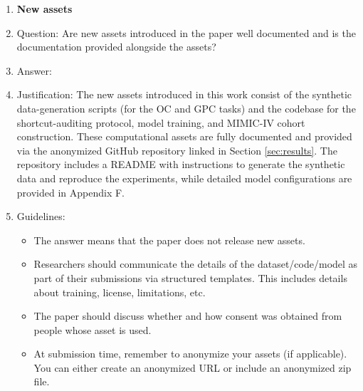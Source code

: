 \documentclass{article}
\theoremstyle{plain}
\theoremstyle{definition}
\theoremstyle{remark}
\begin{document}
\begin{enumerate}
\item {\bf New assets}
    \item[] Question: Are new assets introduced in the paper well documented and is the documentation provided alongside the assets?
    \item[] Answer: \answerYes{}
    \item[] Justification: The new assets introduced in this work consist of the synthetic data-generation scripts (for the OC and GPC tasks) and the codebase for the shortcut-auditing protocol, model training, and MIMIC-IV cohort construction. These computational assets are fully documented and provided via the anonymized GitHub repository linked in Section \ref{sec:results}. The repository includes a README with instructions to generate the synthetic data and reproduce the experiments, while detailed model configurations are provided in Appendix F.
    \item[] Guidelines:
    \begin{itemize}
        \item The answer \answerNA{} means that the paper does not release new assets.
        \item Researchers should communicate the details of the dataset\slash code\slash model as part of their submissions via structured templates. This includes details about training, license, limitations, etc. 
        \item The paper should discuss whether and how consent was obtained from people whose asset is used.
        \item At submission time, remember to anonymize your assets (if applicable). You can either create an anonymized URL or include an anonymized zip file.
    \end{itemize}


\end{enumerate}
\end{document}
